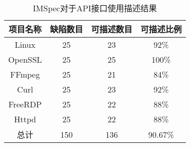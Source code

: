 \begin{table}[b]
	\centering
	\begin{minipage}[t]{0.6\linewidth} %
		\caption{IMSpec对于API接口使用描述结果}
		\label{tab:2-5-description}
			\begin{tabular}{cccc}
			\hline
			项目名称 & 缺陷数目 & 可描述数目 & 可描述比例 \\
			\hline
			Linux & 25 & 23 & 92\% \\
			OpenSSL & 25 & 25 & 100\% \\
			FFmpeg & 25 & 21 & 84\% \\
			Curl & 25 & 23 & 92\% \\
			FreeRDP & 25 & 22 & 88\% \\
			Httpd & 25 & 22 & 88\% \\
			\hline
			总计 & 150 & 136 & 90.67\% \\
			\hline
		\end{tabular}
	\end{minipage}
\end{table}